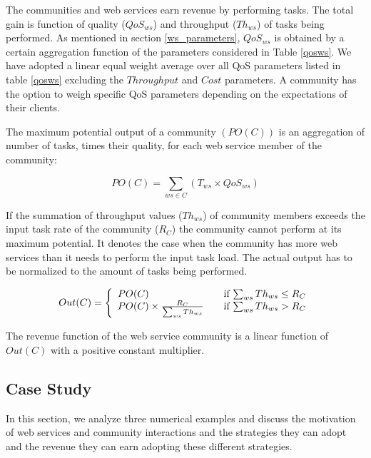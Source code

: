 The communities and web services earn revenue by performing tasks. The total gain is function of quality ($QoS_{ws}$) and throughput ($Th_{ws}$) of tasks being performed. As mentioned in section \ref{ws_parameters}, $QoS_{ws}$ is obtained by a certain aggregation function of the parameters considered in Table \ref{qosws}. We have adopted a linear equal weight average over all QoS parameters listed in table \ref{qosws} excluding the $Throughput$ and $Cost$ parameters. A community has the option to weigh specific QoS parameters depending on the expectations of their clients.

The maximum potential output of a community $(PO(C))$  is an aggregation of number of tasks, times their quality, for each web service member of the community:

\begin{equation}
PO(C) = \sum_{ws \in C}{(T_{ws} \times QoS_{ws})}
\end{equation}

If the summation of throughput values ($Th_{ws}$) of community members exceeds the input task rate of the community ($R_C$) the community cannot perform at its maximum potential. It denotes the case when the community has more web services than it needs to perform the input task load. The actual output has to be normalized to the amount of tasks being performed.

\begin{equation}\label{out_c}
Out(C) = \left\{
  \begin{array}{l l}
    PO(C) & \quad \text{if $\sum_{ws}{Th_{ws}} \leq R_{C}$}\\
    PO(C) \times \frac{R_{C}}{\sum_{ws}{Th_{ws}}} & \quad \text{if $\sum_{ws}{Th_{ws}} > R_{C}$}
  \end{array} \right.
\end{equation}

The revenue function of the web service community is a linear function of $Out(C)$ with a positive constant multiplier.

\subsection{Case Study}

In this section, we analyze three numerical examples and discuss the motivation of web services and community interactions and the strategies they can adopt and the revenue they can earn adopting these different strategies.


